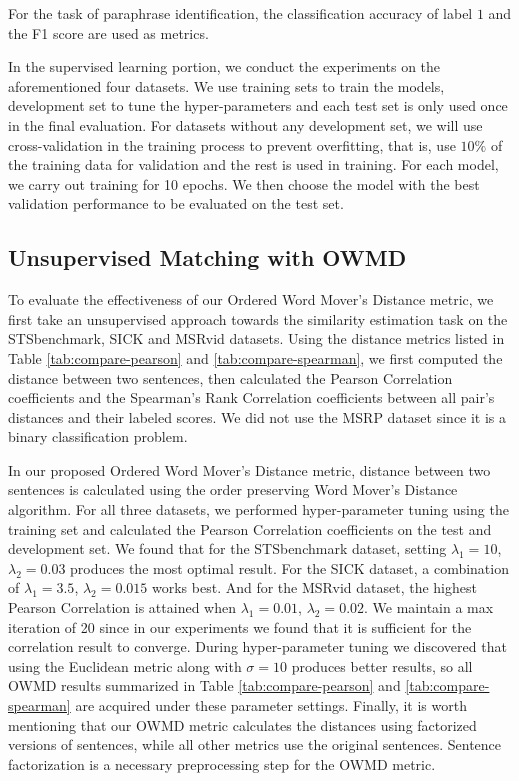 For the task of paraphrase identification, the classification accuracy of label $1$ and the F1 score are used as metrics. 

In the supervised learning portion, we conduct the experiments on the aforementioned four datasets. We use training sets to train the models, development set to tune the hyper-parameters and each test set is only used once in the final evaluation. For datasets without any development set, we will use cross-validation in the training process to prevent overfitting, that is, use $10\%$ of the training data for validation and the rest is used in training. For each model, we carry out training for 10 epochs. We then choose the model with the best validation performance to be evaluated on the test set.  


\subsection{Unsupervised Matching with OWMD}
\label{subsec:eval-owmd}

To evaluate the effectiveness of our Ordered Word Mover's Distance metric, we first take an unsupervised approach towards the similarity estimation task on the STSbenchmark, SICK and MSRvid datasets. Using the distance metrics listed in Table \ref{tab:compare-pearson} and \ref{tab:compare-spearman}, we first computed the distance between two sentences, then calculated the Pearson Correlation coefficients and the Spearman's Rank Correlation coefficients between all pair's distances and their labeled scores. We did not use the MSRP dataset since it is a binary classification problem.


In our proposed Ordered Word Mover's Distance metric, distance between two sentences is calculated using the order preserving Word Mover's Distance algorithm. For all three datasets, we performed hyper-parameter tuning using the training set and calculated the Pearson Correlation coefficients on the test and development set. We found that for the STSbenchmark dataset, setting $\lambda_1=10$, $\lambda_2=0.03$ produces the most optimal result. For the SICK dataset, a combination of $\lambda_1=3.5$, $\lambda_2=0.015$ works best. And for the MSRvid dataset, the highest Pearson Correlation is attained when $\lambda_1=0.01$, $\lambda_2=0.02$.
We maintain a max iteration of 20 since in our experiments we found that it is sufficient for the correlation result to converge.
During hyper-parameter tuning we discovered that using the Euclidean metric along with $\sigma=10$ produces better results, so all OWMD results summarized in Table \ref{tab:compare-pearson} and \ref{tab:compare-spearman} are acquired under these parameter settings. Finally, it is worth mentioning that our OWMD metric calculates the distances using factorized versions of sentences, while all other metrics use the original sentences. Sentence factorization is a necessary preprocessing step for the OWMD metric.


